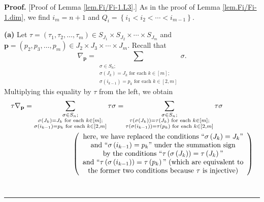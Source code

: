 \documentclass[numbers=enddot,12pt,final,onecolumn,notitlepage]{scrartcl}%
\theoremstyle{definition}
\newenvironment{proof}[1][Proof]{\noindent\textbf{#1.} }{\ \rule{0.5em}{0.5em}}
\let\sumnonlimits\sum
\renewcommand{\sum}{\sumnonlimits\limits}
\begin{document}
\begin{proof}
[Proof of Lemma \ref{lem.Fi/Fi-1.L3}.] As in the proof of Lemma
\ref{lem.Fi/Fi-1.dim}, we find $i_{m}=n+1$ and $Q_{i}=\left\{  i_{1}%
<i_{2}<\cdots<i_{m-1}\right\}  $. \medskip

\textbf{(a)} Let $\tau=\left(  \tau_{1},\tau_{2},\ldots,\tau_{m}\right)  \in
S_{J_{1}}\times S_{J_{2}}\times\cdots\times S_{J_{m}}$ and $\mathbf{p}=\left(
p_{2},p_{3},\ldots,p_{m}\right)  \in J_{2}\times J_{3}\times\cdots\times
J_{m}$. Recall that
\[
\nabla_{\mathbf{p}}=\sum_{\substack{\sigma\in S_{n};\\\sigma\left(
J_{k}\right)  =J_{k}\text{ for each }k\in\left[  m\right]  ;\\\sigma\left(
i_{k-1}\right)  =p_{k}\text{ for each }k\in\left[  2,m\right]  }}\sigma.
\]
Multiplying this equality by $\tau$ from the left, we obtain%
\begin{align*}
\tau\nabla_{\mathbf{p}} &  =\sum_{\substack{\sigma\in S_{n};\\\sigma\left(
J_{k}\right)  =J_{k}\text{ for each }k\in\left[  m\right]  ;\\\sigma\left(
i_{k-1}\right)  =p_{k}\text{ for each }k\in\left[  2,m\right]  }}\tau
\sigma=\sum_{\substack{\sigma\in S_{n};\\\tau\left(  \sigma\left(
J_{k}\right)  \right)  =\tau\left(  J_{k}\right)  \text{ for each }k\in\left[
m\right]  ;\\\tau\left(  \sigma\left(  i_{k-1}\right)  \right)  =\tau\left(
p_{k}\right)  \text{ for each }k\in\left[  2,m\right]  }}\tau\sigma\\
&  \ \ \ \ \ \ \ \ \ \ \ \ \ \ \ \ \ \ \ \ \left(
\begin{array}
[c]{c}%
\text{here, we have replaced the conditions \textquotedblleft}\sigma\left(
J_{k}\right)  =J_{k}\text{\textquotedblright}\\
\text{and \textquotedblleft}\sigma\left(  i_{k-1}\right)  =p_{k}%
\text{\textquotedblright\ under the summation sign}\\
\text{by the conditions \textquotedblleft}\tau\left(  \sigma\left(
J_{k}\right)  \right)  =\tau\left(  J_{k}\right)  \text{\textquotedblright}\\
\text{and \textquotedblleft}\tau\left(  \sigma\left(  i_{k-1}\right)  \right)
=\tau\left(  p_{k}\right)  \text{\textquotedblright\ (which are equivalent
to}\\
\text{the former two conditions because }\tau\text{ is injective)}%
\end{array}
\right)  \\

\end{align*}
\end{proof}
\end{document}
